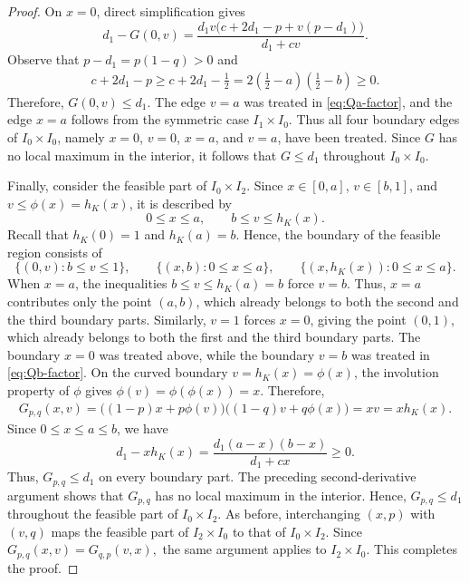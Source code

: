 \documentclass[11pt]{article}
\numberwithin{equation}{section}
\theoremstyle{definition}
\theoremstyle{remark}
\begin{document}
\begin{proof}
On $x=0$, direct simplification gives
\begin{equation*}
 d_1-G(0,v)
 =
 \frac{d_1v
 \bigl(c+2d_1-p+v(p-d_1)\bigr)}
 {d_1+cv}.
\end{equation*}
Observe that
$
 p-d_1=p(1-q)>0
$
and
\begin{align*}
 c+2d_1-p
 \geq
 c+2d_1-\frac12=
 2\left(\frac12-a\right)
  \left(\frac12-b\right)
 \geq0.
\end{align*}
Therefore, $G(0,v)\leq d_1$. 
The edge $v=a$ was treated in \eqref{eq:Qa-factor}, and the edge
$x=a$ follows from the symmetric case $I_1\times I_0$. Thus all four
boundary edges of $I_0\times I_0$, namely $x=0$, $v=0$, $x=a$, and
$v=a$, have been treated. Since $G$ has no local maximum in the
interior, it follows that $G\leq d_1$ throughout
$I_0\times I_0$.






Finally, consider the feasible part of $I_0\times I_2$. Since
$x\in[0,a]$, $v\in[b,1]$, and $v\leq\phi(x)=h_K(x)$, it is described
by
\begin{equation*}
 0\leq x\leq a,
 \qquad
 b\leq v\leq h_K(x).
\end{equation*}
Recall that $h_K(0)=1$ and $h_K(a)=b$. Hence, the boundary of the
feasible region consists of
\begin{equation*}
 \{(0,v):b\leq v\leq1\},
 \qquad
 \{(x,b):0\leq x\leq a\},
 \qquad
 \{(x,h_K(x)):0\leq x\leq a\}.
\end{equation*}
When $x=a$, the inequalities
$
 b\leq v\leq h_K(a)=b
$
force $v=b$. Thus, $x=a$ contributes only the point $(a,b)$, which
already belongs to both the second and the third boundary parts.
Similarly, $v=1$ forces $x=0$, giving the point $(0,1)$, which already belongs to both the first and the third boundary parts.
The boundary $x=0$ was treated above, while the boundary $v=b$ was
treated in \eqref{eq:Qb-factor}. On the curved boundary
$v=h_K(x)=\phi(x)$, the involution property of $\phi$ gives
$
 \phi(v)=\phi(\phi(x))=x.
$
Therefore,
\begin{align*}
 G_{p,q}(x,v)
 =
 \bigl((1-p)x+p\phi(v)\bigr)
 \bigl((1-q)v+q\phi(x)\bigr)=xv=xh_K(x).
\end{align*}
Since $0\leq x\leq a\leq b$, we have
\begin{equation*}
 d_1-xh_K(x)
 =
 \frac{d_1(a-x)(b-x)}{d_1+cx}
 \geq0.
\end{equation*}
Thus, $G_{p,q}\leq d_1$ on every boundary part. The preceding
second-derivative argument shows that $G_{p,q}$ has no local maximum
in the interior. Hence, $G_{p,q}\leq d_1$ throughout the feasible part
of $I_0\times I_2$. As before, interchanging $(x,p)$ with $(v,q)$ maps the feasible part
of $I_2\times I_0$ to that of $I_0\times I_2$. Since
$
 G_{p,q}(x,v)=G_{q,p}(v,x),
$
the same argument applies to $I_2\times I_0$.
This completes the proof.
\end{proof}
\end{document}
